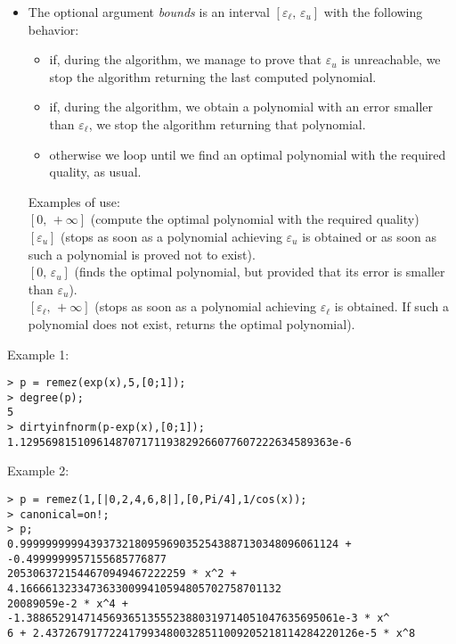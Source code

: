\begin{itemize}
\item The optional argument \emph{bounds} is an interval $[\varepsilon_\ell,\,\varepsilon_u]$
   with the following behavior:\begin{itemize}
     \item if, during the algorithm, we manage to prove that $\varepsilon_u$ is
       unreachable, we stop the algorithm returning the last computed
       polynomial.
     \item if, during the algorithm, we obtain a polynomial with an error smaller
       than $\varepsilon_\ell$, we stop the algorithm returning that polynomial.
     \item otherwise we loop until we find an optimal polynomial with the required
       quality, as usual.\end{itemize}
   Examples of use:\\
     $[0,\,+\infty]$ (compute the optimal polynomial with the required quality)\\
     $[\varepsilon_u]$ (stops as soon as a polynomial achieving $\varepsilon_u$ is
                   obtained or as soon as such a polynomial is proved not to
                   exist).\\
     $[0,\,\varepsilon_u]$ (finds the optimal polynomial, but provided that its error
                      is smaller than $\varepsilon_u$).\\
     $[\varepsilon_\ell,\,+\infty]$ (stops as soon as a polynomial achieving
                             $\varepsilon_\ell$ is obtained. If such a polynomial
                             does not exist, returns the optimal polynomial).
\end{itemize}
\noindent Example 1: 
\begin{center}\begin{minipage}{15cm}\begin{Verbatim}[frame=single,commandchars=\\\|\~]
> p = remez(exp(x),5,[0;1]);
> degree(p);
5
> dirtyinfnorm(p-exp(x),[0;1]);
1.1295698151096148707171193829266077607222634589363e-6
\end{Verbatim}
\end{minipage}\end{center}
\noindent Example 2: 
\begin{center}\begin{minipage}{15cm}\begin{Verbatim}[frame=single,commandchars=\\\|\~]
> p = remez(1,[|0,2,4,6,8|],[0,Pi/4],1/cos(x));
> canonical=on!;
> p;
0.99999999994393732180959690352543887130348096061124 + -0.4999999957155685776877
2053063721544670949467222259 * x^2 + 4.16666132334736330099410594805702758701132
20089059e-2 * x^4 + -1.3886529147145693651355523880319714051047635695061e-3 * x^
6 + 2.4372679177224179934800328511009205218114284220126e-5 * x^8
\end{Verbatim}
\end{minipage}\end{center}

